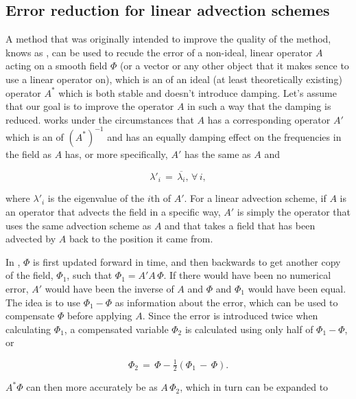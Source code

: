\subsection{Error reduction for linear advection schemes}

A method that was originally intended to improve the quality of the \LS method, knows as \BFECC, can be used to recude the error of a non-ideal, linear operator $A$ acting on a smooth field $\Phi$ (or a vector or any other object that it makes sence to use a linear operator on), which is an \approximation of an ideal (at least theoretically existing) operator $A^*$ which is both stable and doesn't introduce damping. Let's assume that our goal is to improve the operator $A$ in such a way that the damping is reduced. \BFECC works under the circumstances that $A$ has a corresponding operator $A'$ which is an \approximation of $(A^*)^{-1}$ and has an equally damping effect on the frequencies in the field as $A$ has, or more specifically, $A'$ has the same \eigenfunctions as $A$ and

\begin{equation}
\lambda'_i \,=\, \overline{\lambda_i}, \,\forall\,i,
\end{equation}

where $\lambda'_i$ is the eigenvalue of the $i$th \eigenfunction of $A'$. For a linear advection scheme, if $A$ is an operator that advects the field in a specific way, $A'$ is simply the operator that uses the same advection scheme as $A$ and that takes a field that has been advected by $A$ back to the position it came from.

In \BFECC, $\Phi$ is first updated forward in time, and then backwards to get another copy of the field, $\Phi_1$, such that $\Phi_1 = A'A\,\Phi$. If there would have been no numerical error, $A'$ would have been the inverse of $A$ and $\Phi$ and $\Phi_1$ would have been equal. The idea is to use $\Phi_1-\Phi$ as information about the error, which can be used to compensate $\Phi$ before applying $A$. Since the error is introduced twice when calculating $\Phi_1$, a compensated variable $\Phi_2$ is calculated using only half of $\Phi_1-\Phi$, or

\begin{equation}
\Phi_2 \,=\, \Phi - \tfrac{1}{2}(\Phi_1 \,-\, \Phi).
\end{equation}

$A^*\Phi$ can then more accurately be \approximated as $A\,\Phi_2$, which in turn can be expanded to

